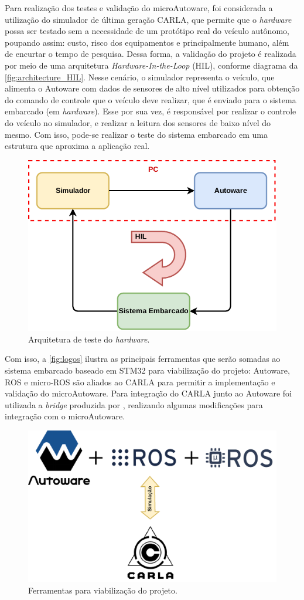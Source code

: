Para realização dos testes e validação do microAutoware, foi considerada a utilização do simulador de última geração CARLA\cite{carla}, que permite que o \textit{hardware} possa ser testado sem a necessidade de um protótipo real do veículo autônomo, poupando assim: custo, risco dos equipamentos e principalmente humano, além de encurtar o tempo de pesquisa. Dessa forma, a validação do projeto é realizada por meio de uma arquitetura \textit{Hardware-In-the-Loop} (HIL), conforme diagrama da \autoref{fig:architecture_HIL}. Nesse cenário, o simulador representa o veículo, que alimenta o Autoware com dados de sensores de alto nível utilizados para obtenção do comando de controle que o veículo deve realizar, que é enviado para o sistema embarcado (em \textit{hardware}). Esse por sua vez, é responsável por realizar o controle do veículo no simulador, e realizar a leitura dos sensores de baixo nível do mesmo. Com isso, pode-se realizar o teste do sistema embarcado em uma estrutura que aproxima a aplicação real.

\begin{figure}[H]
	\centering
	\includegraphics[width=0.55\linewidth]{img/architecture_HIL}
	\caption{Arquitetura de teste do \textit{hardware}.}
	\label{fig:architecture_HIL}
\end{figure}

Com isso, a \autoref{fig:logos} ilustra as principais ferramentas que serão somadas ao sistema embarcado baseado em STM32 para viabilização do projeto: Autoware, ROS e micro-ROS são aliados ao CARLA para permitir a implementação e validação do microAutoware. Para integração do CARLA junto ao Autoware foi utilizada a \textit{bridge} produzida por , realizando algumas modificações para integração com o microAutoware.

\begin{figure}[H]
	\centering
	\includegraphics[width=0.75\linewidth]{img/logos}
	\caption{Ferramentas para viabilização do projeto.}
	\label{fig:logos}
\end{figure}

